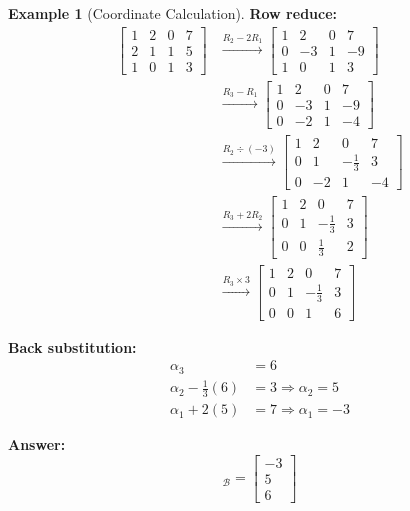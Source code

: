 \documentclass[12pt,a4paper]{article}
\theoremstyle{definition}
\newtheorem{example}{Example}[section]
\begin{document}
\begin{example}[Coordinate Calculation]
\textbf{Row reduce:}
\begin{align}
\left[\begin{array}{ccc|c} 1 & 2 & 0 & 7 \\ 2 & 1 & 1 & 5 \\ 1 & 0 & 1 & 3 \end{array}\right] &\xrightarrow{R_2 - 2R_1} \left[\begin{array}{ccc|c} 1 & 2 & 0 & 7 \\ 0 & -3 & 1 & -9 \\ 1 & 0 & 1 & 3 \end{array}\right] \\
&\xrightarrow{R_3 - R_1} \left[\begin{array}{ccc|c} 1 & 2 & 0 & 7 \\ 0 & -3 & 1 & -9 \\ 0 & -2 & 1 & -4 \end{array}\right] \\
&\xrightarrow{R_2 \div (-3)} \left[\begin{array}{ccc|c} 1 & 2 & 0 & 7 \\ 0 & 1 & -\frac{1}{3} & 3 \\ 0 & -2 & 1 & -4 \end{array}\right] \\
&\xrightarrow{R_3 + 2R_2} \left[\begin{array}{ccc|c} 1 & 2 & 0 & 7 \\ 0 & 1 & -\frac{1}{3} & 3 \\ 0 & 0 & \frac{1}{3} & 2 \end{array}\right] \\
&\xrightarrow{R_3 \times 3} \left[\begin{array}{ccc|c} 1 & 2 & 0 & 7 \\ 0 & 1 & -\frac{1}{3} & 3 \\ 0 & 0 & 1 & 6 \end{array}\right]
\end{align}

\textbf{Back substitution:}
\begin{align}
\alpha_3 &= 6 \\
\alpha_2 - \frac{1}{3}(6) &= 3 \Rightarrow \alpha_2 = 5 \\
\alpha_1 + 2(5) &= 7 \Rightarrow \alpha_1 = -3
\end{align}

\textbf{Answer:}
\begin{equation}
[\mathbf{v}]_\mathcal{B} = \begin{bmatrix} -3 \\ 5 \\ 6 \end{bmatrix}
\end{equation}


\end{example}
\end{document}
